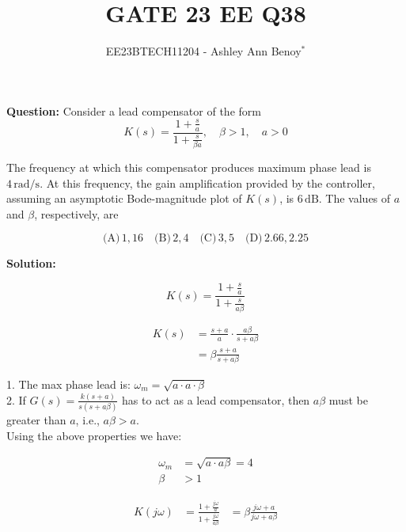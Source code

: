 \documentclass[journal,12pt,twocolumn]{IEEEtran}
\theoremstyle{remark}
\begin{document}
    
    \vspace{3cm}
    
    \title{GATE 23 EE Q38}
    \author{EE23BTECH11204 - Ashley Ann Benoy$^{*}$}%
    \maketitle
    \newpage
    \bigskip
    
    
    
    \textbf{Question: }
    Consider a lead compensator of the form
    \[ K(s) = \frac{1 + \frac{s}{a}}{1 + \frac{s}{\beta a}}, \quad \beta > 1, \quad a > 0 \]
    
    The frequency at which this compensator produces maximum phase lead is \(4 \, \text{rad/s}\). At this frequency, the gain amplification provided by the controller, assuming an asymptotic Bode-magnitude plot of \(K(s)\), is \(6 \, \text{dB}\). The values of \(a\) and \(\beta\), respectively, are
    
    \[
    \text{(A)} \, 1, 16 \quad
    \text{(B)} \, 2, 4 \quad
    \text{(C)} \, 3, 5 \quad
    \text{(D)} \, 2.66, 2.25
    \]
    
    \textbf{Solution:}
    
   
    
    \[ K(s) = \frac{1 + \frac{s}{a}}{1 + \frac{s}{a\beta}} \]
    
    \begin{align}
    K(s) &= \frac{s + a}{a} \cdot \frac{a\beta}{s + a\beta} \\
    &= \beta \frac{s + a}{s + a\beta}
    \end{align}
    
    1. The max phase lead is: \(\omega_m = \sqrt{a \cdot a \cdot \beta}\)\\

    2. If \(G(s) = \frac{k(s+a)}{s(s+a\beta)}\) has to act as a lead compensator, then \(a\beta\) must be greater than \(a\), i.e., \(a\beta > a \).\\
    
  
    
    Using the above properties we have:
    
    \begin{align}
    \omega_m &= \sqrt{ a \cdot a \beta}=4 \\
    \beta &> 1
    \end{align}
    
    \begin{align}
    K(j\omega) &= \frac{1 + \frac{j\omega}{a}}{1 + \frac{j\omega}{a\beta}} 
    &= \beta \frac{j\omega + a}{j\omega + a\beta}
    \end{align}
    
\end{document}
